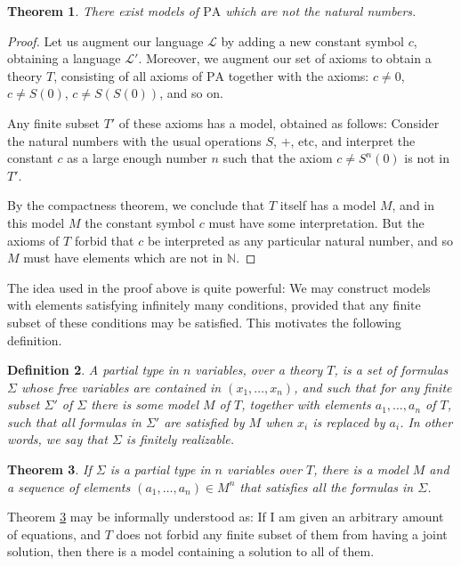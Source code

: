 \documentclass{article}
\newtheorem{theorem}{Theorem}[section]
\newtheorem{definition}[theorem]{Definition}
\theoremstyle{nonumberplain}
\newtheorem{proof}{Proof}
\newcommand{\N}{\mathbb{N}}
\newcommand{\Lang}{\mathcal{L}}
\begin{document}
\begin{theorem}\label{thm:nonstd}
There exist models of $\mathrm{PA}$ which are not the natural numbers.
\end{theorem}

\begin{proof}
Let us augment our language $\Lang$ by adding a new constant symbol $c$, obtaining a language $\Lang'$. Moreover, we augment our set of axioms to obtain a theory $T$, consisting of all axioms of $\mathrm{PA}$ together with the axioms: $c \neq 0$, $c \neq S(0)$, $c \neq S(S(0))$, and so on.

Any finite subset $T'$ of these axioms has a model, obtained as follows: Consider the natural numbers with the usual operations $S$, $+$, etc, and interpret the constant $c$ as a large enough number $n$ such that the axiom $c \neq S^n(0)$ is not in $T'$.

By the compactness theorem, we conclude that $T$ itself has a model $M$, and in this model $M$ the constant symbol $c$ must have some interpretation. But the axioms of $T$ forbid that $c$ be interpreted as any particular natural number, and so $M$ must have elements which are not in $\N$.
\end{proof}

The idea used in the proof above is quite powerful: We may construct models with elements satisfying infinitely many conditions, provided that any finite subset of these conditions may be satisfied. This motivates the following definition.

\begin{definition}
A partial type in $n$ variables, over a theory $T$, is a set of formulas $\Sigma$ whose free variables are contained in $(x_1, \dots, x_n)$, and such that for any finite subset $\Sigma'$ of $\Sigma$ there is some model $M$ of $T$, together with elements $a_1, \dots, a_n$ of $T$, such that all formulas in $\Sigma'$ are satisfied by $M$ when $x_i$ is replaced by $a_i$. In other words, we say that $\Sigma$ is \emph{finitely realizable}.
\end{definition}

\begin{theorem}\label{thm:ptype}
If $\Sigma$ is a partial type in $n$ variables over $T$, there is a model $M$ and a sequence of elements $(a_1, \dots, a_n) \in M^n$ that satisfies all the formulas in $\Sigma$.
\end{theorem}

Theorem \ref{thm:ptype} may be informally understood as: If I am given an arbitrary amount of equations, and $T$ does not forbid any finite subset of them from having a joint solution, then there is a model containing a solution to all of them.
\end{document}

